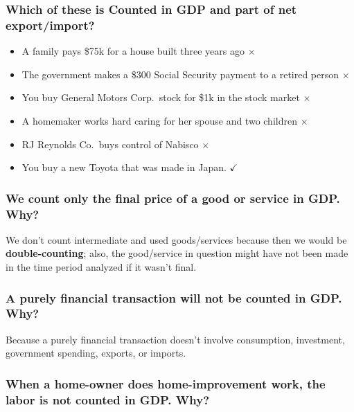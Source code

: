 \documentclass[
  letterpaper,
  DIV=11,
  numbers=noendperiod]{scrartcl}
\providecommand{\tightlist}{%
  \setlength{\itemsep}{0pt}\setlength{\parskip}{0pt}}\usepackage{longtable,booktabs,array}
\begin{document}
\hypertarget{which-of-these-is-counted-in-gdp-and-part-of-net-exportimport}{%
\subsubsection{Which of these is Counted in GDP and part of net
export/import?}\label{which-of-these-is-counted-in-gdp-and-part-of-net-exportimport}}

\begin{itemize}
\tightlist
\item
  A family pays \$75k for a house built three years ago \(\times\)
\item
  The government makes a \$300 Social Security payment to a retired
  person \(\times\)
\item
  You buy General Motors Corp.~stock for \$1k in the stock market
  \(\times\)
\item
  A homemaker works hard caring for her spouse and two children
  \(\times\)
\item
  RJ Reynolds Co.~buys control of Nabisco \(\times\)
\item
  You buy a new Toyota that was made in Japan. \(\checkmark\)
\end{itemize}

\hypertarget{we-count-only-the-final-price-of-a-good-or-service-in-gdp.-why}{%
\subsubsection{We count only the final price of a good or service in
GDP.
Why?}\label{we-count-only-the-final-price-of-a-good-or-service-in-gdp.-why}}

We don't count intermediate and used goods/services because then we
would be \textbf{double-counting}; also, the good/service in question
might have not been made in the time period analyzed if it wasn't final.

\hypertarget{a-purely-financial-transaction-will-not-be-counted-in-gdp.-why}{%
\subsubsection{A purely financial transaction will not be counted in
GDP.
Why?}\label{a-purely-financial-transaction-will-not-be-counted-in-gdp.-why}}

Because a purely financial transaction doesn't involve consumption,
investment, government spending, exports, or imports.

\hypertarget{when-a-home-owner-does-home-improvement-work-the-labor-is-not-counted-in-gdp.-why}{%
\subsubsection{When a home-owner does home-improvement work, the labor
is not counted in GDP.
Why?}\label{when-a-home-owner-does-home-improvement-work-the-labor-is-not-counted-in-gdp.-why}}
\end{document}
